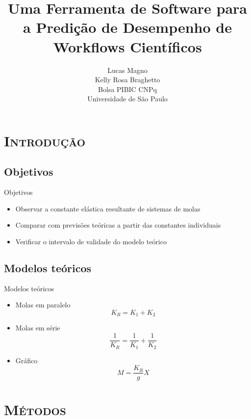 \documentclass[xcolor=x11names,compress]{beamer}
\date{}
\title{\LARGE Uma Ferramenta de Software para a Predição de Desempenho
de Workflows Científicos}
\author{
    Lucas Magno\\
    Kelly Rosa Braghetto \\[1.5cm]
    Bolsa PIBIC CNPq\\[0.2cm]
    Universidade de São Paulo
}
\renewcommand{\(}{\begin{columns}}
\renewcommand{\)}{\end{columns}}
\newcommand{\<}[1]{\begin{column}{#1}}
\renewcommand{\>}{\end{column}}
\begin{document}
\begin{frame}
    \titlepage
\end{frame}

\section{\scshape Introdução}



\subsection{Objetivos}

\begin{frame}{Objetivos}
    \begin{itemize}
        \item Observar a constante elástica resultante de sistemas de molas
        \item Comparar com previsões teóricas a partir das constantes individuais
        \item Verificar o intervalo de validade do modelo teórico
    \end{itemize}
\end{frame}



\subsection{Modelos teóricos}

\begin{frame}{Modelos teóricos}
    \begin{itemize}
        \item Molas em paralelo
            \[ K_{R} = K_{1}+K_{2}\]
        \item Molas em série
            \[ \frac{1}{K_{R}} = \frac{1}{K_{1}} + \frac{1}{K_{2}} \]
        \item Gráfico
            \[M = \frac{K_{R}}{g}X\]
    \end{itemize}
\end{frame}


\section{\scshape Métodos}
\end{document}
